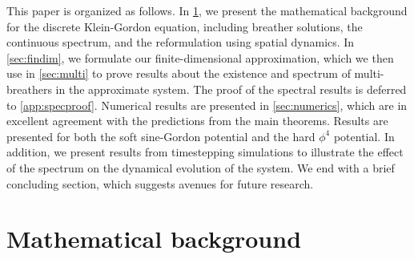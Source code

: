 \documentclass[12pt,reqno]{amsart}
\theoremstyle{definition}
\begin{document}
This paper is organized as follows. In \cref{sec:bg}, we present the mathematical background for the discrete Klein-Gordon equation, including breather solutions, the continuous spectrum, and the reformulation using spatial dynamics. In \cref{sec:findim}, we formulate our finite-dimensional approximation, which we then use in \cref{sec:multi} to prove results about the existence and spectrum of multi-breathers in the approximate system. The proof of the spectral results is deferred to \cref{app:specproof}. Numerical results are presented in \cref{sec:numerics}, which are in excellent agreement with the predictions from the main theorems. Results are presented for both the soft sine-Gordon potential and the hard $\phi^4$ potential. In addition, we present results from timestepping simulations to illustrate the effect of the spectrum on the dynamical evolution of the system. We end with a brief concluding section, which suggests avenues for future research.

\section{Mathematical background}\label{sec:bg}
\end{document}
